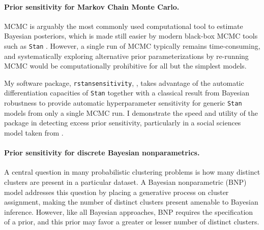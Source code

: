 \paragraph{Prior sensitivity for Markov Chain Monte Carlo.}

MCMC is arguably the most commonly used computational tool to estimate Bayesian
posteriors, which is made still easier by modern black-box MCMC tools such as
\texttt{Stan} \citep{carpenter:2017:stan, rstan}.  However, a single run of MCMC
typically remains time-consuming, and systematically exploring alternative prior
parameterizations by re-running MCMC would be computationally prohibitive for
all but the simplest models.

My software package, \texttt{rstansensitivity},
\citep{giordano:2020:rstansensitivity, giordano:2018:mcmchyper}, takes advantage
of the automatic differentiation capacities of \texttt{Stan}
\citep{carpenter:2015:stanmath} together with a classical result from  Bayesian
robustness \citep{gustafson:1996:localposterior, basu:1996:local,
giordano:2018:covariances} to provide automatic hyperparameter sensitivity for
generic \texttt{Stan} models from only a single MCMC run.  I demonstrate the
speed and utility of the package in detecting excess prior sensitivity,
particularly in a social sciences model taken from \citet[Chapter
13.5]{gelman:2006:arm}.


\paragraph{Prior sensitivity for discrete Bayesian nonparametrics.}

A central question in many probabilistic clustering problems is how many
distinct clusters are present in a particular dataset. A Bayesian nonparametric
(BNP) model addresses this question by placing a generative process on cluster
assignment, making the number of distinct clusters present amenable to Bayesian
inference.  However, like all Bayesian approaches, BNP requires the
specification of a prior, and this prior may favor a greater or lesser number of
distinct clusters.


